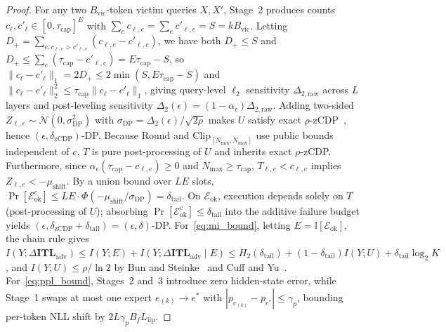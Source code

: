 \documentclass[final,5p,times,twocolumn]{elsarticle}
\theoremstyle{definition}
\theoremstyle{remark}
\begin{document}
\begin{proof}
For any two $B_{\mathrm{vic}}$-token victim queries $X, X'$, Stage~2 produces counts $c_\ell, c'_\ell \in [0, \tau_{\mathrm{cap}}]^E$ with $\sum_e c_{\ell,e} = \sum_e c'_{\ell,e} = S = k B_{\mathrm{vic}}$. Letting $D_+ = \sum_{e: c_{\ell,e} > c'_{\ell,e}}(c_{\ell,e} - c'_{\ell,e})$, we have both $D_+ \le S$ and $D_+ \le \sum_e(\tau_{\mathrm{cap}} - c'_{\ell,e}) = E\tau_{\mathrm{cap}} - S$, so $\|c_\ell - c'_\ell\|_1 = 2 D_+ \le 2\min(S, E\tau_{\mathrm{cap}} - S)$ and $\|c_\ell - c'_\ell\|_2^2 \le \tau_{\mathrm{cap}}\|c_\ell - c'_\ell\|_1$, giving query-level $\ell_2$ sensitivity $\Delta_{2,\mathrm{raw}}$ across $L$ layers and post-leveling sensitivity $\Delta_2(\epsilon) = (1 - \alpha_\epsilon)\Delta_{2,\mathrm{raw}}$. Adding two-sided $Z_{\ell,e} \sim \mathcal{N}(0, \sigma_{\mathrm{DP}}^2)$ with $\sigma_{\mathrm{DP}} = \Delta_2(\epsilon)/\sqrt{2\rho}$ makes $U$ satisfy exact $\rho$-zCDP~\cite{bun2016zcdp}, hence $(\epsilon, \delta_{\mathrm{zCDP}})$-DP. Because $\mathrm{Round}$ and $\mathrm{Clip}_{[N_{\min}, N_{\max}]}$ use public bounds independent of $c$, $T$ is pure post-processing of $U$ and inherits exact $\rho$-zCDP. Furthermore, since $\alpha_\epsilon(\tau_{\mathrm{cap}} - c_{\ell,e}) \ge 0$ and $N_{\max} \ge \tau_{\mathrm{cap}}$, $T_{\ell,e} < c_{\ell,e}$ implies $Z_{\ell,e} < -\mu_{\mathrm{shift}}$. By a union bound over $LE$ slots, $\Pr[\mathcal{E}_{\mathrm{ok}}^c] \le LE \cdot \Phi(-\mu_{\mathrm{shift}}/\sigma_{\mathrm{DP}}) = \delta_{\mathrm{tail}}$. On $\mathcal{E}_{\mathrm{ok}}$, execution depends solely on $T$ (post-processing of $U$); absorbing $\Pr[\mathcal{E}_{\mathrm{ok}}^c] \le \delta_{\mathrm{tail}}$ into the additive failure budget yields $(\epsilon, \delta_{\mathrm{zCDP}} + \delta_{\mathrm{tail}}) = (\epsilon, \delta)$-DP. For~\eqref{eq:mi_bound}, letting $E = \mathbb{I}[\mathcal{E}_{\mathrm{ok}}]$, the chain rule gives $I(Y; \Delta\mathbf{ITL}_{\mathrm{adv}}) \le I(Y; E) + I(Y; \Delta\mathbf{ITL}_{\mathrm{adv}} \mid E) \le H_2(\delta_{\mathrm{tail}}) + (1-\delta_{\mathrm{tail}}) I(Y; U) + \delta_{\mathrm{tail}}\log_2 K$, and $I(Y; U) \le \rho/\ln 2$ by Bun and Steinke~\cite{bun2016zcdp} and Cuff and Yu~\cite{cuff2016dpmi}. For~\eqref{eq:ppl_bound}, Stages~2 and~3 introduce zero hidden-state error, while Stage~1 swaps at most one expert $e_{(k)} \to e^*$ with $|p_{e_{(k)}} - p_{e^*}| \le \gamma_p$, bounding per-token NLL shift by $2 L \gamma_p B_f L_{\mathrm{lip}}$.
\end{proof}

\end{document}
